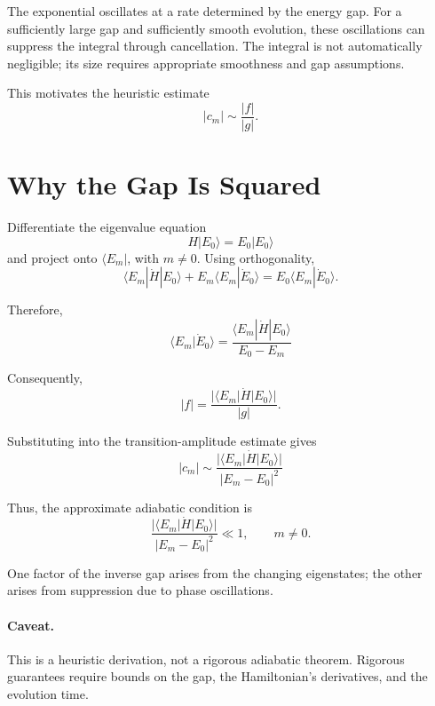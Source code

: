 \documentclass[11pt]{article}
\begin{document}
The exponential oscillates at a rate determined by the energy gap.
For a sufficiently large gap and sufficiently smooth evolution,
these oscillations can suppress the integral through cancellation.
The integral is not automatically negligible; its size requires
appropriate smoothness and gap assumptions.

This motivates the heuristic estimate
\[
|c_m|\sim \frac{|f|}{|g|}.
\]

\section{Why the Gap Is Squared}

Differentiate the eigenvalue equation
\[
H|E_0\rangle=E_0|E_0\rangle
\]
and project onto $\langle E_m|$, with $m\ne 0$. Using orthogonality,
\[
\langle E_m|\dot H|E_0\rangle
+E_m\langle E_m|\dot E_0\rangle
=E_0\langle E_m|\dot E_0\rangle.
\]

Therefore,
\[
\boxed{
\langle E_m|\dot E_0\rangle
=\frac{\langle E_m|\dot H|E_0\rangle}{E_0-E_m}
}
\]

Consequently,
\[
|f|=\frac{|\langle E_m|\dot H|E_0\rangle|}{|g|}.
\]

Substituting into the transition-amplitude estimate gives
\[
\boxed{
|c_m|\sim
\frac{|\langle E_m|\dot H|E_0\rangle|}
{|E_m-E_0|^2}
}
\]

Thus, the approximate adiabatic condition is
\[
\boxed{
\frac{|\langle E_m|\dot H|E_0\rangle|}
{|E_m-E_0|^2}\ll 1,
\qquad m\ne 0.
}
\]

One factor of the inverse gap arises from the changing eigenstates;
the other arises from suppression due to phase oscillations.

\paragraph{Caveat.}
This is a heuristic derivation, not a rigorous adiabatic theorem.
Rigorous guarantees require bounds on the gap, the Hamiltonian's
derivatives, and the evolution time.
\end{document}
